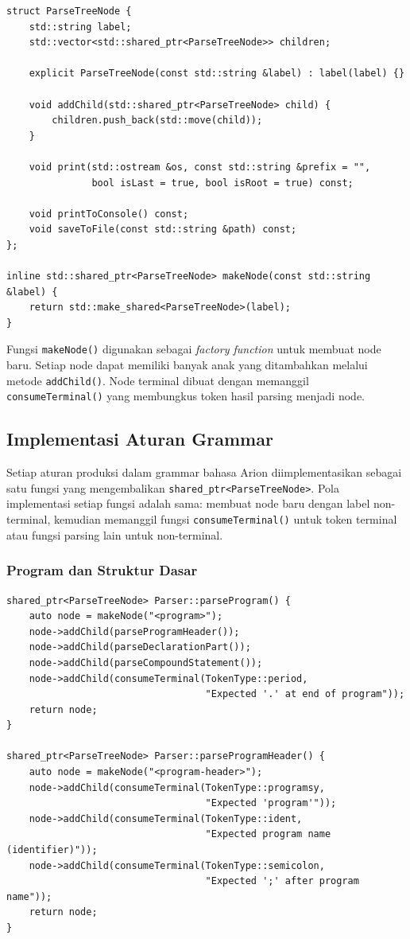 ﻿\documentclass[12pt,a4paper]{article}
\begin{document}
\begin{lstlisting}[style=cpp, caption={Struktur data ParseTreeNode}]
struct ParseTreeNode {
    std::string label;
    std::vector<std::shared_ptr<ParseTreeNode>> children;

    explicit ParseTreeNode(const std::string &label) : label(label) {}

    void addChild(std::shared_ptr<ParseTreeNode> child) {
        children.push_back(std::move(child));
    }

    void print(std::ostream &os, const std::string &prefix = "",
               bool isLast = true, bool isRoot = true) const;

    void printToConsole() const;
    void saveToFile(const std::string &path) const;
};

inline std::shared_ptr<ParseTreeNode> makeNode(const std::string &label) {
    return std::make_shared<ParseTreeNode>(label);
}
\end{lstlisting}

Fungsi \texttt{makeNode()} digunakan sebagai \textit{factory function} untuk membuat node baru. Setiap node dapat memiliki banyak anak yang ditambahkan melalui metode \texttt{addChild()}. Node terminal dibuat dengan memanggil \texttt{consumeTerminal()} yang membungkus token hasil parsing menjadi node.

\subsection{Implementasi Aturan Grammar}

Setiap aturan produksi dalam grammar bahasa Arion diimplementasikan sebagai satu fungsi yang mengembalikan \texttt{shared\_ptr<ParseTreeNode>}. Pola implementasi setiap fungsi adalah sama: membuat node baru dengan label non-terminal, kemudian memanggil fungsi \texttt{consumeTerminal()} untuk token terminal atau fungsi parsing lain untuk non-terminal.

\subsubsection{Program dan Struktur Dasar}

\begin{lstlisting}[style=cpp, caption={Implementasi aturan <program> dan <program-header>}]
shared_ptr<ParseTreeNode> Parser::parseProgram() {
    auto node = makeNode("<program>");
    node->addChild(parseProgramHeader());
    node->addChild(parseDeclarationPart());
    node->addChild(parseCompoundStatement());
    node->addChild(consumeTerminal(TokenType::period,
                                   "Expected '.' at end of program"));
    return node;
}

shared_ptr<ParseTreeNode> Parser::parseProgramHeader() {
    auto node = makeNode("<program-header>");
    node->addChild(consumeTerminal(TokenType::programsy,
                                   "Expected 'program'"));
    node->addChild(consumeTerminal(TokenType::ident,
                                   "Expected program name (identifier)"));
    node->addChild(consumeTerminal(TokenType::semicolon,
                                   "Expected ';' after program name"));
    return node;
}
\end{lstlisting}
\end{document}
